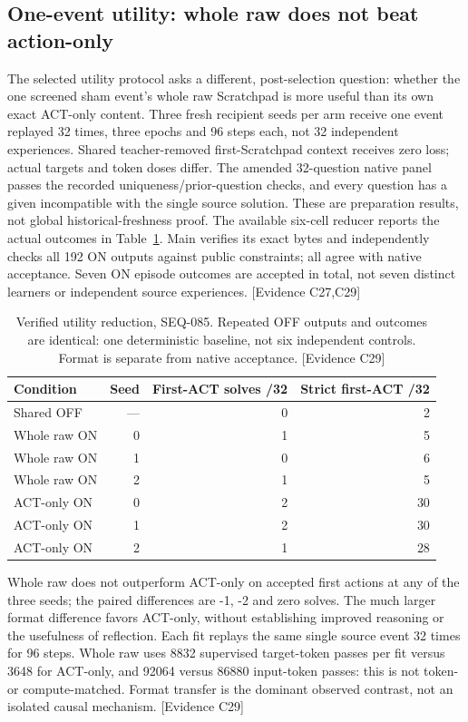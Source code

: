 \documentclass[11pt]{article}
\newcommand{\ev}[1]{\textsf{[Evidence #1]}}
\begin{document}
\subsection{One-event utility: whole raw does not beat action-only}

The selected utility protocol asks a different, post-selection question:
whether the one screened sham event's whole raw Scratchpad is more useful than
its own exact ACT-only content. Three fresh recipient seeds per arm receive one
event replayed 32 times, three epochs and 96 steps each, not 32 independent
experiences. Shared teacher-removed first-Scratchpad context receives zero loss;
actual targets and token doses differ. The amended 32-question native panel
passes the recorded uniqueness/prior-question checks, and every question has a
given incompatible with the single source solution. These are preparation
results, not global historical-freshness proof. The available six-cell reducer
reports the actual outcomes in Table~\ref{tab:utility}. Main verifies its exact
bytes and independently checks all 192 ON outputs against public constraints;
all agree with native acceptance. Seven ON episode outcomes are accepted in
total, not seven distinct learners or independent source experiences.
\ev{C27,C29}

\begin{table}[ht]
\centering
\begin{tabular}{lrrr}
\toprule
Condition & Seed & First-ACT solves /32 & Strict first-ACT /32 \\
\midrule
Shared OFF & --- & 0 & 2 \\
Whole raw ON & 0 & 1 & 5 \\
Whole raw ON & 1 & 0 & 6 \\
Whole raw ON & 2 & 1 & 5 \\
ACT-only ON & 0 & 2 & 30 \\
ACT-only ON & 1 & 2 & 30 \\
ACT-only ON & 2 & 1 & 28 \\
\bottomrule
\end{tabular}
\caption{Verified utility reduction, SEQ-085. Repeated OFF outputs
and outcomes are identical: one deterministic baseline, not six independent
controls. Format is separate from native acceptance. \ev{C29}}
\label{tab:utility}
\end{table}

Whole raw does not outperform ACT-only on accepted first actions at any of the
three seeds; the paired differences are -1, -2 and zero solves. The much larger
format difference favors ACT-only, without establishing improved reasoning or
the usefulness of reflection. Each fit replays the same single source event
32 times for 96 steps. Whole raw uses 8832 supervised target-token passes per
fit versus 3648 for ACT-only, and 92064 versus 86880 input-token passes: this is
not token- or compute-matched. Format transfer is the dominant observed contrast,
not an isolated causal mechanism. \ev{C29}
\end{document}
